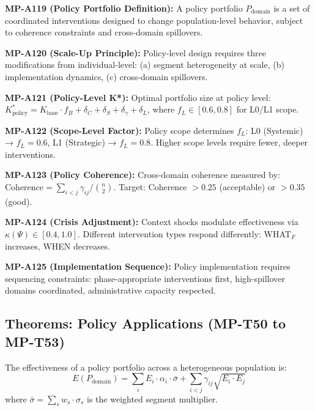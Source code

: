 \begin{tcolorbox}[colback=red!3!white, colframe=red!50!black,
    title=\textbf{Axioms: Policy Applications Theory (Chapter 22)}]

\textbf{MP-A119 (Policy Portfolio Definition):} A policy portfolio $P_{\text{domain}}$ is a set of coordinated interventions designed to change population-level behavior, subject to coherence constraints and cross-domain spillovers.

\textbf{MP-A120 (Scale-Up Principle):} Policy-level design requires three modifications from individual-level: (a) segment heterogeneity at scale, (b) implementation dynamics, (c) cross-domain spillovers.

\textbf{MP-A121 (Policy-Level K*):} Optimal portfolio size at policy level: $K^*_{\text{policy}} = K_{\text{base}} \cdot f_B + \delta_C + \delta_S + \delta_\gamma + \delta_L$, where $f_L \in [0.6, 0.8]$ for L0/L1 scope.

\textbf{MP-A122 (Scope-Level Factor):} Policy scope determines $f_L$: L0 (Systemic) → $f_L = 0.6$, L1 (Strategic) → $f_L = 0.8$. Higher scope levels require fewer, deeper interventions.

\textbf{MP-A123 (Policy Coherence):} Cross-domain coherence measured by: $\text{Coherence} = \sum_{i<j} \gamma_{ij} / \binom{n}{2}$. Target: Coherence $> 0.25$ (acceptable) or $> 0.35$ (good).

\textbf{MP-A124 (Crisis Adjustment):} Context shocks modulate effectiveness via $\kappa(\Psi) \in [0.4, 1.0]$. Different intervention types respond differently: WHAT$_F$ increases, WHEN decreases.

\textbf{MP-A125 (Implementation Sequence):} Policy implementation requires sequencing constraints: phase-appropriate interventions first, high-spillover domains coordinated, administrative capacity respected.

\end{tcolorbox}

\subsection{Theorems: Policy Applications (MP-T50 to MP-T53)}

\begin{theorem}
The effectiveness of a policy portfolio across a heterogeneous population is:
\begin{equation}
E(P_{\text{domain}}) = \sum_{i} E_i \cdot \alpha_i \cdot \bar{\sigma} + \sum_{i<j} \gamma_{ij} \sqrt{E_i \cdot E_j}
\end{equation}
where $\bar{\sigma} = \sum_s w_s \cdot \sigma_s$ is the weighted segment multiplier.
\end{theorem}

